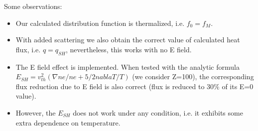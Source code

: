 \documentclass[review]{elsarticle}
\newcommand{\vth}{v_{th}}
\newcommand{\fM}{f_M}
\begin{document}
Some observations:
\begin{itemize}
  \item Our calculated distribution function is thermalized, 
  i.e. $f_0 = \fM$.
  \item With added scattering we also obtain the correct value of calculated 
  heat flux, i.e. $q = q_{SH}$, nevertheless, this works with no E field.
  \item The E field effect is implemented. When tested with the analytic 
  formula $E_{SH} = \vth^2(\nabla ne /ne + 5/2 nabla T/T)$ 
  (we consider Z=100),
  the corresponding flux reduction due to E field is also correct 
  (flux is reduced to 30$\%$ of its E=0 value).
  \item However, the $E_{SH}$ does not work under any condition, 
  i.e. it exhibits some extra dependence on temperature.
\end{itemize}
\end{document}
